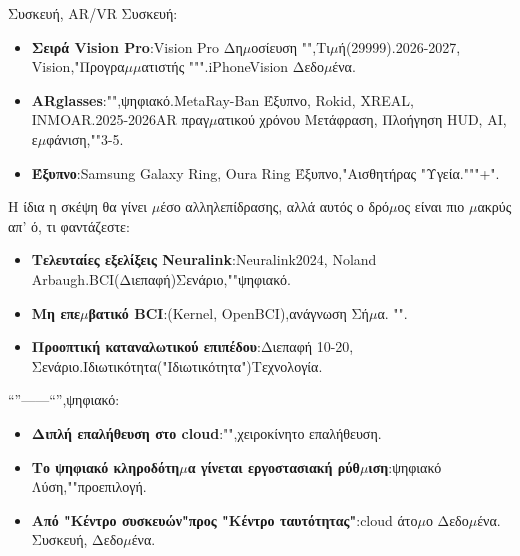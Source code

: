 


Συσκευή, AR/VR Συσκευή:

\begin{itemize}
  \item \textbf{Σειρά Vision Pro}:Vision Pro Δη$\mu$οσίευση "",Τι$\mu$ή(29999).2026-2027, Vision,"Προγρα$\mu$$\mu$ατιστής """.iPhoneVision Δεδο$\mu$ένα.
  \item \textbf{ARglasses}:"",ψηφιακό.MetaRay-Ban Έξυπνο, Rokid, XREAL, INMOAR.2025-2026AR πραγ$\mu$ατικού χρόνου Μετάφραση, Πλοήγηση HUD, AI, ε$\mu$φάνιση,""3-5.
  \item \textbf{Έξυπνο}:Samsung Galaxy Ring, Oura Ring Έξυπνο,"Αισθητήρας "Υγεία."""+".
\end{itemize}


Η ίδια η σκέψη θα γίνει $\mu$έσο αλληλεπίδρασης, αλλά αυτός ο δρό$\mu$ος είναι πιο $\mu$ακρύς απ' ό, τι φαντάζεστε:

\begin{itemize}
  \item \textbf{Τελευταίες εξελίξεις Neuralink}:Neuralink2024, Noland Arbaugh.BCI(Διεπαφή)Σενάριο,""ψηφιακό.
  \item \textbf{Μη επε$\mu$βατικό BCI}:(Kernel, OpenBCI),ανάγνωση Σή$\mu$α. "".
  \item \textbf{Προοπτική καταναλωτικού επιπέδου}:Διεπαφή 10-20, Σενάριο.Ιδιωτικότητα("Ιδιωτικότητα")Τεχνολογία.
\end{itemize}


“”——“”,ψηφιακό:

\begin{itemize}
  \item \textbf{Διπλή επαλήθευση στο cloud}:"",χειροκίνητο επαλήθευση.
  \item \textbf{Το ψηφιακό κληροδότη$\mu$α γίνεται εργοστασιακή ρύθ$\mu$ιση}:ψηφιακό Λύση,""προεπιλογή.
  \item \textbf{Από "Κέντρο συσκευών"προς "Κέντρο ταυτότητας"}:cloud άτο$\mu$ο Δεδο$\mu$ένα. Συσκευή, Δεδο$\mu$ένα.
\end{itemize}

